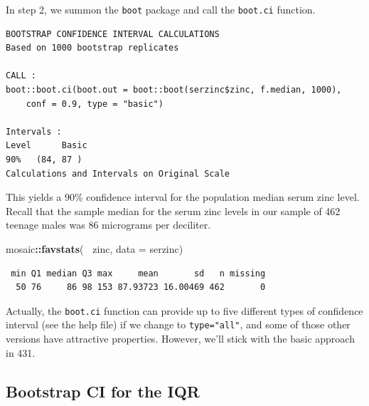 \documentclass[
]{book}
\newenvironment{Shaded}{\begin{snugshade}}{\end{snugshade}}
\newcommand{\DataTypeTok}[1]{\textcolor[rgb]{0.13,0.29,0.53}{#1}}
\newcommand{\DecValTok}[1]{\textcolor[rgb]{0.00,0.00,0.81}{#1}}
\newcommand{\FloatTok}[1]{\textcolor[rgb]{0.00,0.00,0.81}{#1}}
\newcommand{\KeywordTok}[1]{\textcolor[rgb]{0.13,0.29,0.53}{\textbf{#1}}}
\newcommand{\NormalTok}[1]{#1}
\newcommand{\OperatorTok}[1]{\textcolor[rgb]{0.81,0.36,0.00}{\textbf{#1}}}
\newcommand{\StringTok}[1]{\textcolor[rgb]{0.31,0.60,0.02}{#1}}
\begin{document}
In step 2, we summon the \texttt{boot} package and call the \texttt{boot.ci} function.

\begin{Shaded}
\end{Shaded}

\begin{verbatim}
BOOTSTRAP CONFIDENCE INTERVAL CALCULATIONS
Based on 1000 bootstrap replicates

CALL : 
boot::boot.ci(boot.out = boot::boot(serzinc$zinc, f.median, 1000), 
    conf = 0.9, type = "basic")

Intervals : 
Level      Basic         
90%   (84, 87 )  
Calculations and Intervals on Original Scale
\end{verbatim}

This yields a 90\% confidence interval for the population median serum zinc level. Recall that the sample median for the serum zinc levels in our sample of 462 teenage males was 86 micrograms per deciliter.

\begin{Shaded}
\begin{Highlighting}[]
\NormalTok{mosaic}\OperatorTok{::}\KeywordTok{favstats}\NormalTok{(}\OperatorTok{~}\StringTok{ }\NormalTok{zinc, }\DataTypeTok{data =}\NormalTok{ serzinc)}
\end{Highlighting}
\end{Shaded}

\begin{verbatim}
 min Q1 median Q3 max     mean       sd   n missing
  50 76     86 98 153 87.93723 16.00469 462       0
\end{verbatim}

Actually, the \texttt{boot.ci} function can provide up to five different types of confidence interval (see the help file) if we change to \texttt{type="all"}, and some of those other versions have attractive properties. However, we'll stick with the basic approach in 431.

\hypertarget{bootstrap-ci-for-the-iqr}{%
\subsection{Bootstrap CI for the IQR}\label{bootstrap-ci-for-the-iqr}}
\end{document}
